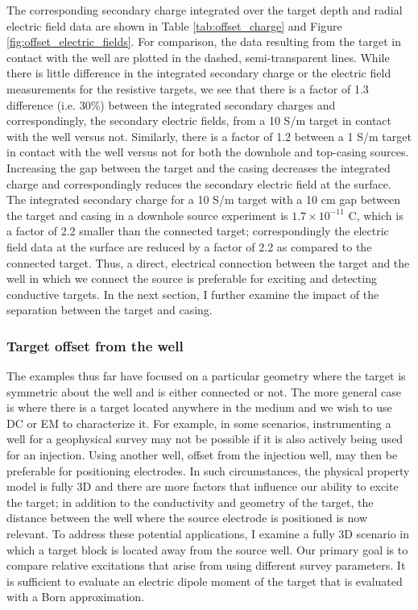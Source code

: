 The corresponding secondary charge integrated over the target depth and radial electric field data are shown in Table \ref{tab:offset_charge} and Figure \ref{fig:offset_electric_fields}. For comparison, the data resulting from the target in contact with the well are plotted in the dashed, semi-transparent lines. While there is little difference in the integrated secondary charge or the electric field measurements for the resistive targets, we see that there is a factor of 1.3 difference (i.e. 30\%) between the integrated secondary charges and correspondingly, the secondary electric fields, from a 10 S/m target in contact with the well versus not. Similarly, there is a factor of 1.2 between a 1 S/m target in contact with the well versus not for both the downhole and top-casing sources. Increasing the gap between the target and the casing decreases the integrated charge and correspondingly reduces the secondary electric field at the surface. The integrated secondary charge for a 10 S/m target with a 10 cm gap between the target and casing in a downhole source experiment is $1.7 \times 10^{-11}$ C, which is a factor of 2.2 smaller than the connected target; correspondingly the electric field data at the surface are reduced by a factor of 2.2 as compared to the connected target. Thus, a direct, electrical connection between the target and the well in which we connect the source is preferable for exciting and detecting conductive targets. In the next section, I further examine the impact of the separation between the target and casing.








\subsubsection{Target offset from the well}

The examples thus far have focused on a particular geometry where the target is symmetric about the well and is either connected or not. The more general case is where there is a target located anywhere in the medium and we wish to use DC or EM to characterize it. For example, in some scenarios, instrumenting a well for a geophysical survey may not be possible if it is also actively being used for an injection. Using another well, offset from the injection well, may then be preferable for positioning electrodes. In such circumstances, the physical property model is fully 3D and there are more factors that influence our ability to excite the target; in addition to the conductivity and geometry of the target, the distance between the well where the source electrode is positioned is now relevant. To address these potential applications, I examine a fully 3D scenario in which a target block is located away from the source well. Our primary goal is to compare relative excitations that arise from using different survey parameters. It is sufficient to evaluate an electric dipole moment of the target that is evaluated with a Born approximation.


